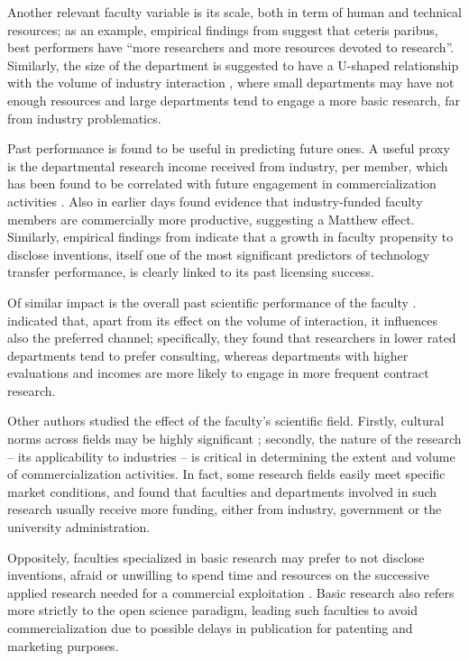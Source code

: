 Another relevant faculty variable is its scale, both in term of human and technical resources; as an example, empirical findings from \citet{OwenSmith2001} suggest that ceteris paribus, best performers have \enquote{more researchers and more resources devoted to research}. Similarly, the size of the department is suggested to have a U-shaped relationship with the volume of industry interaction \citep{DEste2007}, where small departments may have not enough resources and large departments tend to engage a more basic research, far from industry problematics.

Past performance is found to be useful in predicting future ones. A useful proxy is the departmental research income received from industry, per member, which has been found to be correlated with future engagement in commercialization activities \citep{DEste2007}. Also \citet{Blumenthal1996} in earlier days found evidence that industry-funded faculty members are commercially more productive, suggesting a Matthew effect. Similarly, empirical findings from \citet{Thursby2002} indicate that a growth in faculty propensity to disclose inventions, itself one of the most significant predictors of technology transfer performance, is clearly linked to its past licensing success. 

Of similar impact is the overall past scientific performance of the faculty \citep{OShea2005}. \citet{DEste2011} indicated that, apart from its effect on the volume of interaction, it influences also the preferred channel; specifically, they found that researchers in lower rated departments tend to prefer consulting, whereas departments with higher evaluations and incomes are more likely to engage in more frequent contract research.

Other authors studied the effect of the faculty's scientific field. Firstly, cultural norms across fields may be highly significant \citep{DEste2007}; secondly, the nature of the research – its applicability to industries – is critical in determining the extent and volume of commercialization activities. In fact, some research fields easily meet specific market conditions, and \citet{OShea2005} found that faculties and departments involved in such research usually receive more funding, either from industry, government or the university administration.

Oppositely, faculties specialized in basic research may prefer to not disclose inventions, afraid or unwilling to spend time and resources on the successive applied research needed for a commercial exploitation \citep{Bercovitz2006}. Basic research also refers more strictly to the open science paradigm, leading such faculties to avoid commercialization due to possible delays in publication for patenting and marketing purposes. 

